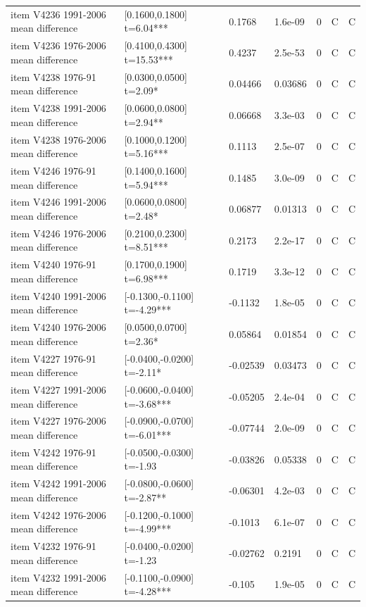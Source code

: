 {\begin{longtable}{@{}p{.245\linewidth}p{.17\linewidth}p{.17\linewidth}p{.085\linewidth}p{.060\linewidth}p{.08\linewidth}p{.07\linewidth}@{}}
item V4236 1991-2006 mean difference & [0.1600,0.1800] t=6.04*** & 0.1768 & 1.6e-09 & 0 & C & C\\
item V4236 1976-2006 mean difference & [0.4100,0.4300] t=15.53*** & 0.4237 & 2.5e-53 & 0 & C & C\\
item V4238 1976-91 mean difference & [0.0300,0.0500] t=2.09* & 0.04466 & 0.03686 & 0 & C & C\\
item V4238 1991-2006 mean difference & [0.0600,0.0800] t=2.94** & 0.06668 & 3.3e-03 & 0 & C & C\\
item V4238 1976-2006 mean difference & [0.1000,0.1200] t=5.16*** & 0.1113 & 2.5e-07 & 0 & C & C\\
item V4246 1976-91 mean difference & [0.1400,0.1600] t=5.94*** & 0.1485 & 3.0e-09 & 0 & C & C\\
item V4246 1991-2006 mean difference & [0.0600,0.0800] t=2.48* & 0.06877 & 0.01313 & 0 & C & C\\
item V4246 1976-2006 mean difference & [0.2100,0.2300] t=8.51*** & 0.2173 & 2.2e-17 & 0 & C & C\\
item V4240 1976-91 mean difference & [0.1700,0.1900] t=6.98*** & 0.1719 & 3.3e-12 & 0 & C & C\\
item V4240 1991-2006 mean difference & [-0.1300,-0.1100] t=-4.29*** & -0.1132 & 1.8e-05 & 0 & C & C\\
item V4240 1976-2006 mean difference & [0.0500,0.0700] t=2.36* & 0.05864 & 0.01854 & 0 & C & C\\
item V4227 1976-91 mean difference & [-0.0400,-0.0200] t=-2.11* & -0.02539 & 0.03473 & 0 & C & C\\
item V4227 1991-2006 mean difference & [-0.0600,-0.0400] t=-3.68*** & -0.05205 & 2.4e-04 & 0 & C & C\\
item V4227 1976-2006 mean difference & [-0.0900,-0.0700] t=-6.01*** & -0.07744 & 2.0e-09 & 0 & C & C\\
item V4242 1976-91 mean difference & [-0.0500,-0.0300] t=-1.93 & -0.03826 & 0.05338 & 0 & C & C\\
item V4242 1991-2006 mean difference & [-0.0800,-0.0600] t=-2.87** & -0.06301 & 4.2e-03 & 0 & C & C\\
item V4242 1976-2006 mean difference & [-0.1200,-0.1000] t=-4.99*** & -0.1013 & 6.1e-07 & 0 & C & C\\
item V4232 1976-91 mean difference & [-0.0400,-0.0200] t=-1.23 & -0.02762 & 0.2191 & 0 & C & C\\
item V4232 1991-2006 mean difference & [-0.1100,-0.0900] t=-4.28*** & -0.105 & 1.9e-05 & 0 & C & C\\

\end{longtable}}
